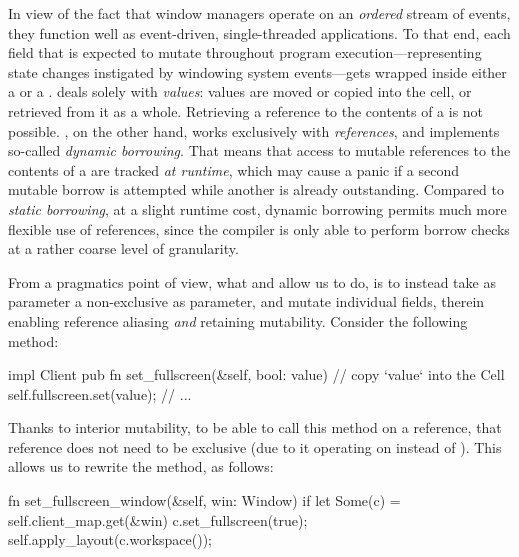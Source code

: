 In view of the fact that window managers operate on an \textit{ordered} stream
of events, they function well as event-driven, single-threaded applications.
To that end, each  field that is expected to mutate throughout
program execution---representing state changes instigated by windowing system
events---gets wrapped inside either a  or a .
 deals solely with \textit{values}: values are moved or copied
into the cell, or retrieved from it as a whole. Retrieving a reference to
the contents of a  is not possible. , on the other
hand, works exclusively with \textit{references}, and implements so-called
\textit{dynamic borrowing}. That means that access to mutable references to
the contents of a  are tracked \textit{at runtime}, which may
cause a panic if a second mutable borrow is attempted while another is already
outstanding. Compared to \textit{static borrowing}, at a slight runtime cost,
dynamic borrowing permits much more flexible use of references, since the
compiler is only able to perform borrow checks at a rather coarse level of
granularity.

From a pragmatics point of view, what  and  allow us to
do, is to instead take as parameter a non-exclusive  as parameter,
and mutate individual fields, therein enabling reference aliasing \textit{and}
retaining mutability. Consider the following  method:

\begin{rustblock}
  impl Client {
    pub fn set_fullscreen(&self, bool: value) {
      // copy `value` into the Cell
      self.fullscreen.set(value);
    }
    // ...
  }
\end{rustblock}

Thanks to interior mutability, to be able to call this method on a 
reference, that reference does not need to be exclusive (due to it operating
on  instead of ). This allows us to rewrite the
 method, as follows:

\begin{rustblock}
  fn set_fullscreen_window(&self, win: Window) {
    if let Some(c) = self.client_map.get(&win) {
      c.set_fullscreen(true);
      self.apply_layout(c.workspace());
    }
  }
\end{rustblock}


